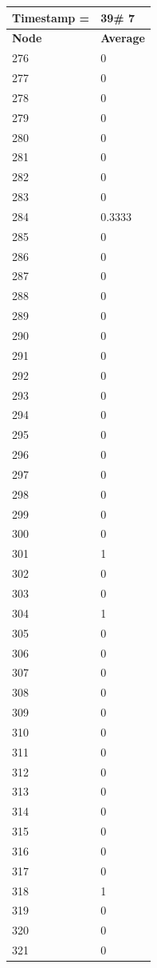\begin{tabular}{|l||l|}
\hline
\textbf{Timestamp =} & \textbf{39}\# 7\\\hline
	\textbf{Node} & \textbf{Average} \\ \hline
\hline
	276 & 0 \\ \hline
	277 & 0 \\ \hline
	278 & 0 \\ \hline
	279 & 0 \\ \hline
	280 & 0 \\ \hline
	281 & 0 \\ \hline
	282 & 0 \\ \hline
	283 & 0 \\ \hline
	284 & 0.3333 \\ \hline
	285 & 0 \\ \hline
	286 & 0 \\ \hline
	287 & 0 \\ \hline
	288 & 0 \\ \hline
	289 & 0 \\ \hline
	290 & 0 \\ \hline
	291 & 0 \\ \hline
	292 & 0 \\ \hline
	293 & 0 \\ \hline
	294 & 0 \\ \hline
	295 & 0 \\ \hline
	296 & 0 \\ \hline
	297 & 0 \\ \hline
	298 & 0 \\ \hline
	299 & 0 \\ \hline
	300 & 0 \\ \hline
	301 & 1 \\ \hline
	302 & 0 \\ \hline
	303 & 0 \\ \hline
	304 & 1 \\ \hline
	305 & 0 \\ \hline
	306 & 0 \\ \hline
	307 & 0 \\ \hline
	308 & 0 \\ \hline
	309 & 0 \\ \hline
	310 & 0 \\ \hline
	311 & 0 \\ \hline
	312 & 0 \\ \hline
	313 & 0 \\ \hline
	314 & 0 \\ \hline
	315 & 0 \\ \hline
	316 & 0 \\ \hline
	317 & 0 \\ \hline
	318 & 1 \\ \hline
	319 & 0 \\ \hline
	320 & 0 \\ \hline
	321 & 0 \\ \hline
\end{tabular}
